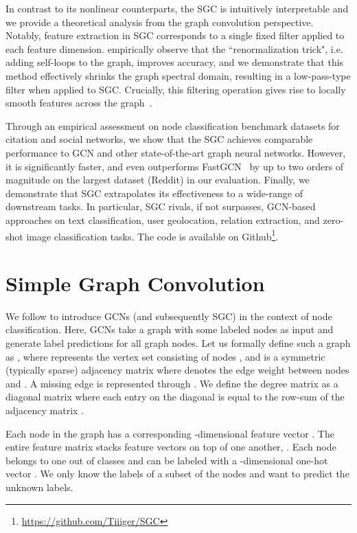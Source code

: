 \documentclass{article}
\newcommand{\Method}{Simple Graph Convolution}
\newcommand{\method}{SGC}
\begin{document}
In contrast to its nonlinear counterparts, the  \method{} is intuitively interpretable and 
we provide a theoretical analysis from the graph convolution perspective. 
Notably, feature extraction in \method{} corresponds to a single fixed filter applied to each feature dimension. 
\citet{gcn} empirically observe that the ``renormalization trick", i.e. adding self-loops to the graph, improves accuracy, and we demonstrate that this method effectively shrinks the graph spectral domain, resulting in a low-pass-type filter when applied to \method{}. 
Crucially, this filtering operation gives rise to locally smooth features across the graph~\cite{Bruna13}.

Through an empirical assessment on node classification benchmark datasets for citation and social networks, we show that the \method{} achieves comparable performance to GCN and other state-of-the-art graph neural networks. However, it is significantly faster, and even outperforms  FastGCN~\citep{FastGCN} by  up to two orders of magnitude on the largest dataset (Reddit) in our evaluation. 
Finally, we demonstrate that \method{} extrapolates its effectiveness to a wide-range of downstream tasks. In particular, \method{} rivals, if not surpasses, GCN-based approaches on text classification, user geolocation, relation extraction, and zero-shot image classification tasks. 
The code is available on Github\footnote{\url{https://github.com/Tiiiger/SGC}}.

 
\section{\Method{}}
We follow \citet{gcn} to introduce GCNs (and subsequently \method{}) in the context of node classification. Here, GCNs take a graph with some labeled nodes as input and generate label predictions for all graph nodes. Let us formally define such a graph as , where  represents the vertex set consisting of nodes , and 
 is a symmetric (typically sparse) adjacency matrix
where  denotes the edge weight between nodes  and . A missing edge is represented through .
 We define the degree matrix  as a diagonal matrix where each entry on the diagonal is equal to the row-sum of the adjacency matrix . 


Each node  in the graph has a corresponding -dimensional feature vector . The entire feature matrix  stacks  feature vectors on top of one another, . 
Each node belongs to one out of  classes and can be labeled with a -dimensional one-hot vector .
We only know the labels of a subset of the nodes and want to predict the unknown labels.
\end{document}
